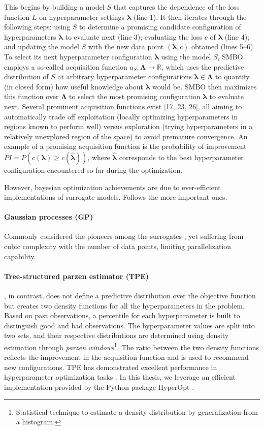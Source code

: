 \noindent This begins by building a model $S$ that captures the dependence of the loss function $L$ on hyperparameter settings $\pmb{\lambda}$ (line 1).
It then iterates through the following steps: using $S$ to determine a promising candidate configuration of hyperparameters $\pmb{\lambda}$ to evaluate next (line 3); evaluating the loss $c$ of $\pmb{\lambda}$ (line 4); and updating the model $S$ with the new data point $(\pmb{\lambda}, c)$ obtained (lines 5–6).
To select its next hyperparameter configuration $\pmb{\lambda}$ using the model $S$, SMBO employs a so-called acquisition function $a_{S} : \pmb{\Lambda} \rightarrow \mathbb{R}$, which uses the predictive distribution of $S$ at arbitrary hyperparameter configurations $\pmb{\lambda} \in \pmb{\Lambda}$ to quantify (in closed form) how useful knowledge about $\pmb{\lambda}$ would be.
SMBO then maximizes this function over $\pmb{\Lambda}$ to select the most promising configuration $\pmb{\lambda}$ to evaluate next.
Several prominent acquisition functions exist [17, 23, 26], all aiming to automatically trade off exploitation (locally optimizing hyperparameters in regions known to perform well) versus exploration (trying hyperparameters in a relatively unexplored region of the space) to avoid premature convergence.
An example of a promising acquisition function is the probability of improvement $PI = P(c(\pmb{\lambda}) \ge c(\hat{\pmb{\lambda}}))$, where $\hat{\pmb{\lambda}}$ corresponds to the best hyperparameter configuration encountered so far during the optimization.

However, bayesian optimization achievements are due to ever-efficient implementations of surrogate models.
Follows the more important ones.

\paragraph{Gaussian processes (GP)} Commonly considered the pioneers among the surrogates \cite{112, 80}, yet suffering from cubic complexity with the number of data points, limiting parallelization capability.

\paragraph{Tree-structured parzen estimator (TPE)} \cite{13}, in contrast, does not define a predictive distribution over the objective function but creates two density functions for all the hyperparameters in the problem.
Based on past observations, a percentile for each hyperparameter is built to distinguish good and bad observations.
The hyperparameter values are split into two sets, and their respective distributions are determined using density estimation through \textit{parzen windows}\footnote{Statistical technique to estimate a density distribution by generalization from a histogram.}.
The ratio between the two density functions reflects the improvement in the acquisition function and is used to recommend new configurations.
TPE has demonstrated excellent performance in hyperparameter optimization tasks \cite{13, 12, 35, 37, 115}.
In this thesis, we leverage an efficient implementation provided by the Python package HyperOpt \cite{hyperopt}.

